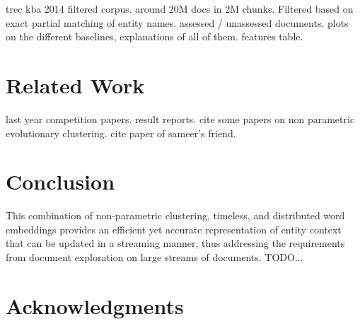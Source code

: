 \documentclass{article}
\begin{document}
trec kba 2014 filtered corpus.
around 20M docs in 2M chunks. Filtered based on exact partial matching of entity names.
assessed / unassessed documents.
plots on the different baselines, explanations of all of them.
features table.

\section{Related Work}
\label{related}

last year competition papers. result reports.
cite some papers on non parametric evolutionary clustering.
cite paper of sameer's friend.


\section{Conclusion}

This combination of non-parametric clustering, timeless, and distributed word embeddings provides an efficient yet accurate representation of entity context that can be updated in a streaming manner, thus addressing the requirements from document exploration on large streams of documents.
TODO...

\section*{Acknowledgments} 
 


\end{document}
